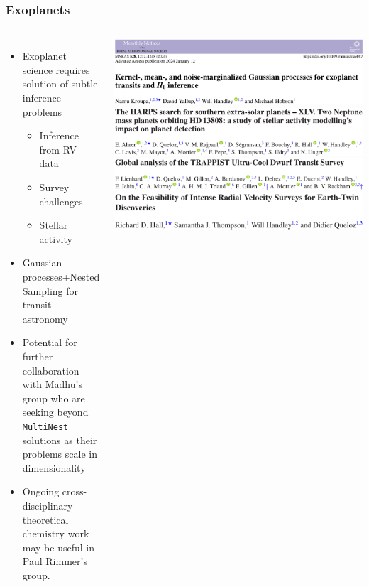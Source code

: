 \documentclass[aspectratio=169]{beamer}
\begin{document}
\begin{frame}
    \frametitle{Exoplanets}

    \begin{columns}
        \begin{itemize}
            \item Exoplanet science requires solution of subtle inference problems
                \begin{itemize}
                    \item Inference from RV data~
                    \item Survey challenges~
                    \item Stellar activity~ 
                \end{itemize}
            \item Gaussian processes+Nested Sampling for transit astronomy~
            \item Potential for further collaboration with Madhu's group who are seeking beyond \texttt{MultiNest} solutions as their problems scale in dimensionality
            \item Ongoing cross-disciplinary theoretical chemistry work may be useful in Paul Rimmer's group.
        \end{itemize}

        \includegraphics[width=\textwidth]{figures/exoplanet_kernel.pdf}%
        \vspace{10pt}
        \includegraphics[width=\textwidth]{figures/harps_headline.pdf}%
        \vspace{10pt}
        \includegraphics[width=\textwidth]{figures/trappist_headline.pdf}%
        \vspace{10pt}
        \includegraphics[width=\textwidth]{figures/rv_headline.pdf}%
    \end{columns}
\end{frame}
\end{document}
